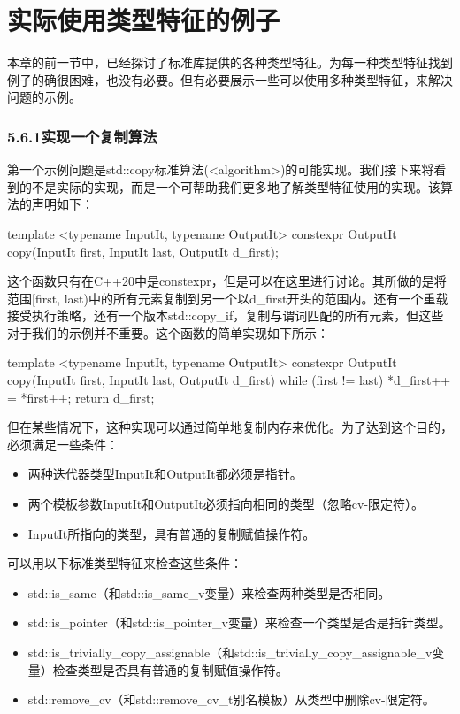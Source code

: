 \section{实际使用类型特征的例子}

本章的前一节中，已经探讨了标准库提供的各种类型特征。为每一种类型特征找到例子的确很困难，也没有必要。但有必要展示一些可以使用多种类型特征，来解决问题的示例。

\subsubsection{5.6.1\hspace{0.2cm}实现一个复制算法}

第一个示例问题是std::copy标准算法(<algorithm>)的可能实现。我们接下来将看到的不是实际的实现，而是一个可帮助我们更多地了解类型特征使用的实现。该算法的声明如下：

\begin{cpp}
template <typename InputIt, typename OutputIt>
constexpr OutputIt copy(InputIt first, InputIt last,
						OutputIt d_first);
\end{cpp}

这个函数只有在C++20中是constexpr，但是可以在这里进行讨论。其所做的是将范围[first, last)中的所有元素复制到另一个以d\_first开头的范围内。还有一个重载接受执行策略，还有一个版本std::copy\_if，复制与谓词匹配的所有元素，但这些对于我们的示例并不重要。这个函数的简单实现如下所示：

\begin{cpp}
template <typename InputIt, typename OutputIt>
constexpr OutputIt copy(InputIt first, InputIt last,
						OutputIt d_first)
{
	while (first != last)
	{
		*d_first++ = *first++;
	}
	return d_first;
}
\end{cpp}

但在某些情况下，这种实现可以通过简单地复制内存来优化。为了达到这个目的，必须满足一些条件：

\begin{itemize}
\item
两种迭代器类型InputIt和OutputIt都必须是指针。

\item
两个模板参数InputIt和OutputIt必须指向相同的类型（忽略cv-限定符）。

\item
InputIt所指向的类型，具有普通的复制赋值操作符。
\end{itemize}

可以用以下标准类型特征来检查这些条件：

\begin{itemize}
\item
std::is\_same（和std::is\_same\_v变量）来检查两种类型是否相同。

\item
std::is\_pointer（和std::is\_pointer\_v变量）来检查一个类型是否是指针类型。

\item
std::is\_trivially\_copy\_assignable（和std::is\_trivially\_copy\_assignable\_v变量）检查类型是否具有普通的复制赋值操作符。

\item
std::remove\_cv（和std::remove\_cv\_t别名模板）从类型中删除cv-限定符。
\end{itemize}

